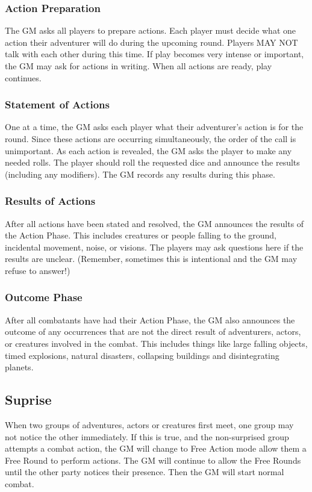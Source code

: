 \begin{multicols*}{2}
\subsubsection{Action Preparation}
The GM asks all players to prepare actions. Each player must decide what one action their adventurer will do during the upcoming round. Players MAY NOT talk with each other during this time. If play becomes very intense or important, the GM may ask for actions in writing. When all actions are ready, play continues.
\subsubsection{Statement of Actions}
One at a time, the GM asks each player what their adventurer's action is for the round. Since these actions are occurring simultaneously, the order of the call is unimportant. As each action is revealed, the GM asks the player to make any needed rolls. The player should roll the requested dice and announce the results (including any modifiers). The GM records any results during this phase.
\subsubsection{Results of Actions}
After all actions have been stated and resolved, the GM announces the results of the Action Phase. This includes creatures or people falling to the ground, incidental movement, noise, or visions. The players may ask questions here if the results are unclear. (Remember, sometimes this is intentional and the GM may refuse to answer!)
\subsubsection{Outcome Phase}
After all combatants have had their Action Phase, the GM also announces the outcome of any occurrences that are not the direct result of adventurers, actors, or creatures involved in the combat. This includes things like large falling objects, timed explosions, natural disasters, collapsing buildings and disintegrating planets.
\subsection{Suprise}
When two groups of adventures, actors or creatures first meet, one group may not notice the other immediately. If this is true, and the non-surprised group attempts a combat
action, the GM will change to Free Action mode allow them a Free Round to perform actions. The GM will continue to allow the Free Rounds until the other party notices their presence. Then the GM will start normal combat.

\end{multicols*}
